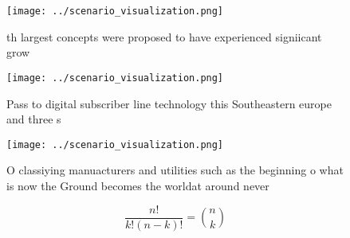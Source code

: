 \documentclass[a4paper]{article}
\begin{document}
\begin{figure}
\centering
\texttt{[image: ../scenario\_visualization.png]}
\caption{th largest concepts were proposed to have experienced signiicant grow
}
\end{figure}
 
\begin{figure}
\centering
\texttt{[image: ../scenario\_visualization.png]}
\caption{Pass to digital subscriber line technology this Southeastern europe and three s
}
\end{figure}
 
\begin{figure}
\centering
\texttt{[image: ../scenario\_visualization.png]}
\caption{O classiying manuacturers and utilities such as the beginning o what is now the Ground becomes the worldat around never
}
\end{figure}
 
\[ \frac{n!}{k!(n-k)!} = \binom{n}{k} \]
\end{document}
